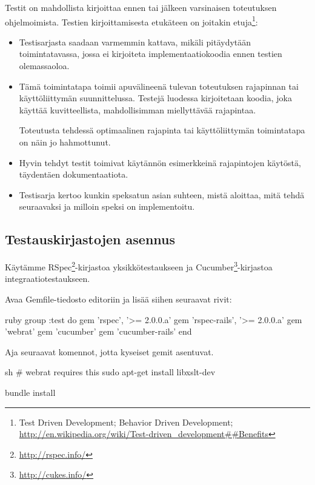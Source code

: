 \documentclass{article}
\newcommand{\en}[1]{\foreignlanguage{english}{#1}}
\begin{document}
Testit on mahdollista kirjoittaa ennen tai jälkeen varsinaisen toteutuksen
ohjelmoimista. Testien kirjoittamisesta etukäteen on joitakin
etuja\footnote{\en{Test Driven Development; Behavior Driven Development;
\url{http://en.wikipedia.org/wiki/Test-driven\_development##Benefits}}}:

\begin{itemize}
\item
Testisarjasta saadaan varmemmin kattava, mikäli pitäydytään toimintatavassa,
jossa ei kirjoiteta implementaatiokoodia ennen testien olemassaoloa.

\item
Tämä toimintatapa toimii apuvälineenä tulevan toteutuksen rajapinnan tai
käyttöliittymän suunnittelussa. Testejä luodessa kirjoitetaan koodia, joka
käyttää kuvitteellista, mahdollisimman miellyttävää rajapintaa.

Toteutusta tehdessä optimaalinen rajapinta tai käyttöliittymän toimintatapa on
näin jo hahmottunut.

\item
Hyvin tehdyt testit toimivat käytännön esimerkkeinä rajapintojen käytöstä,
täydentäen dokumentaatiota.

\item
Testisarja kertoo kunkin speksatun asian suhteen, mistä aloittaa, mitä tehdä
seuraavaksi ja milloin speksi on implementoitu.
\end{itemize}

\subsection{Testauskirjastojen asennus}

Käytämme RSpec\footnote{\url{http://rspec.info/}}-kirjastoa yksikkötestaukseen
ja Cucumber\footnote{\url{http://cukes.info/}}-kirjastoa
integraatiotestaukseen.

\begin{samepage}
Avaa Gemfile-tiedosto editoriin ja lisää siihen seuraavat rivit:

\begin{pygmented}{ruby}
group :test do
  gem 'rspec', '>= 2.0.0.a'
  gem 'rspec-rails', '>= 2.0.0.a'
  gem 'webrat'
  gem 'cucumber'
  gem 'cucumber-rails'
end
\end{pygmented}
\end{samepage}

\begin{samepage}
Aja seuraavat komennot, jotta kyseiset gemit asentuvat.

\begin{pygmented}{sh}
# webrat requires this
sudo apt-get install libxslt-dev

bundle install
\end{pygmented}
\end{samepage}
\end{document}
